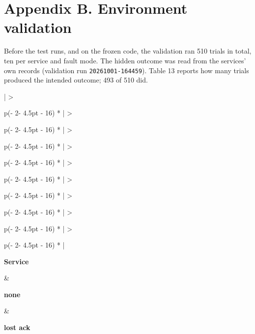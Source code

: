 \documentclass[
  10pt,
]{article}
\begin{document}
\hypertarget{appendix-b.-environment-validation}{%
\section*{Appendix B. Environment
validation}\label{appendix-b.-environment-validation}}

Before the test runs, and on the frozen code, the validation ran 510
trials in total, ten per service and fault mode. The hidden outcome was
read from the services' own records (validation run
\texttt{20261001-164459}). Table 13 reports how many trials produced the
intended outcome; 493 of 510 did.

\begin{longtable}[]{|
  >{\raggedright\arraybackslash}p{(\columnwidth - 2\tabcolsep - 4.5pt - 16\tabcolsep) * }|
  >{\raggedright\arraybackslash}p{(\columnwidth - 2\tabcolsep - 4.5pt - 16\tabcolsep) * }|
  >{\raggedright\arraybackslash}p{(\columnwidth - 2\tabcolsep - 4.5pt - 16\tabcolsep) * }|
  >{\raggedright\arraybackslash}p{(\columnwidth - 2\tabcolsep - 4.5pt - 16\tabcolsep) * }|
  >{\raggedright\arraybackslash}p{(\columnwidth - 2\tabcolsep - 4.5pt - 16\tabcolsep) * }|
  >{\raggedright\arraybackslash}p{(\columnwidth - 2\tabcolsep - 4.5pt - 16\tabcolsep) * }|
  >{\raggedright\arraybackslash}p{(\columnwidth - 2\tabcolsep - 4.5pt - 16\tabcolsep) * }|
  >{\raggedright\arraybackslash}p{(\columnwidth - 2\tabcolsep - 4.5pt - 16\tabcolsep) * }|
  >{\raggedright\arraybackslash}p{(\columnwidth - 2\tabcolsep - 4.5pt - 16\tabcolsep) * }|}
\caption{\textbf{Table 13.} Environment validation: trials whose
realised outcome (number of executions, read from the service) matched
the intended hidden outcome of the mode. The SeaweedFS conditional
create turns a redelivered request into a refusal (one execution, as
intended).}\tabularnewline
\noalign{\global\arrayrulewidth=1.1pt}\hline\noalign{\global\arrayrulewidth=0.4pt}
\begin{minipage}[b]{\linewidth}\raggedright\bfseries
Service
\end{minipage} & \begin{minipage}[b]{\linewidth}\raggedright\bfseries
none
\end{minipage} & \begin{minipage}[b]{\linewidth}\raggedright\bfseries
lost ack

\end{minipage}
\end{longtable}
\end{document}
